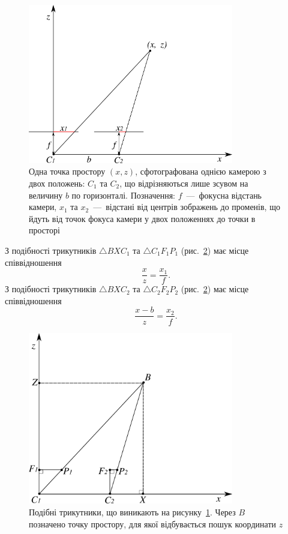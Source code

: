 \begin{figure}[h]
  \centering
  \includegraphics[width=0.8\textwidth]{images/2d_geometry}
  \caption{Одна точка простору $\left(x, z \right)$,
           сфотографована однією камерою з двох положень: $C_1$ та $C_2$,
           що відрізняються лише зсувом на величину $b$ по горизонталі.
           Позначення: $f$~---~фокусна відстань камери,
           $x_1$ та $x_2$~---~відстані від центрів зображень до променів,
           що йдуть від точок фокуса камери у двох положеннях до точки
           в просторі}
  \label{fig:geometry}
\end{figure}

З подібності трикутників $\triangle BXC_1$ та $\triangle C_1 F_1 P_1$
(рис.~\ref{fig:triangles}) має місце співвідношення
\begin{equation} \label{eq:triangle:1}
    \frac{x}{z} = \frac{x_1}{f}.
\end{equation}
З подібності трикутників $\triangle BXC_2$ та $\triangle C_2 F_2 P_2$
(рис.~\ref{fig:triangles}) має місце співвідношення
\begin{equation} \label{eq:triangle:2}
    \frac{x - b}{z} = \frac{x_2}{f}.
\end{equation}

\begin{figure}[h]
  \centering
  \includegraphics[width=0.8\textwidth]{images/2d_triangles}
  \caption{Подібні трикутники, що виникають на рисунку~\ref{fig:geometry}.
           Через $B$ позначено точку простору,
           для якої відбувається пошук координати $z$}
  \label{fig:triangles}
\end{figure}

